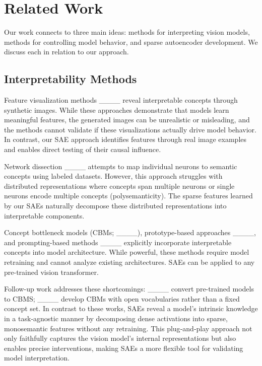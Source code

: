 \section{Related Work}
\label{sec:related-work}

Our work connects to three main ideas: methods for interpreting vision models, methods for controlling model behavior, and sparse autoencoder development.
We discuss each in relation to our approach.

\subsection{Interpretability Methods}

Feature visualization methods ____ reveal interpretable concepts through synthetic images. 
While these approaches demonstrate that models learn meaningful features, the generated images can be unrealistic or misleading, and the methods cannot validate if these visualizations actually drive model behavior. In contrast, our SAE approach identifies features through real image examples and enables direct testing of their causal influence.

Network dissection ____ attempts to map individual neurons to semantic concepts using labeled datasets. However, this approach struggles with distributed representations where concepts span multiple neurons or single neurons encode multiple concepts (polysemanticity). The sparse features learned by our SAEs naturally decompose these distributed representations into interpretable components.

Concept bottleneck models (CBMs; ____), prototype-based approaches ____, and prompting-based methods
____ explicitly incorporate interpretable concepts into model architecture. 
While powerful, these methods require model retraining and cannot analyze existing architectures. 
SAEs can be applied to any pre-trained vision transformer.


Follow-up work addresses these shortcomings: %
____ convert pre-trained models to CBMS; ____ develop CBMs with open vocabularies rather than a fixed concept set.
In contrast to these works, SAEs reveal a model’s intrinsic knowledge in a task‐agnostic manner by decomposing dense activations into sparse, monosemantic features without any retraining. 
This plug‐and‐play approach not only faithfully captures the vision model’s internal representations but also enables precise interventions, making SAEs a more flexible tool for validating model interpretation.

